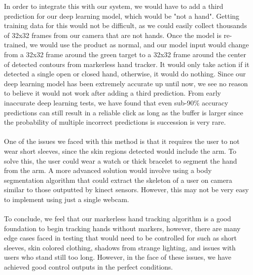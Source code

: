 \documentclass[twoside,twocolumn]{article}
\begin{document}
In order to integrate this with our system, we would have to add a third prediction for our deep learning model, which would be "not a hand". Getting training data for this would not be difficult, as we could easily collect thousands of 32x32 frames from our camera that are not hands. Once the model is re-trained, we would use the product as normal, and our model input would change from a 32x32 frame around the green target to a 32x32 frame around the center of detected contours from markerless hand tracker. It would only take action if it detected a single open or closed hand, otherwise, it would do nothing. Since our deep learning model has been extremely accurate up until now, we see no reason to believe it would not work after adding a third prediction. From early inaccurate deep learning tests, we have found that even sub-90\% accuracy predictions can still result in a reliable click as long as the buffer is larger since the probability of multiple incorrect predictions is succession is very rare.\\ \\
One of the issues we faced with this method is that it requires the user to not wear short sleeves, since the skin regions detected would include the arm. To solve this, the user could wear a watch or thick bracelet to segment the hand from the arm. A more advanced solution would involve using a body segmentation algorithm that could extract the skeleton of a user on camera similar to those outputted by kinect sensors. However, this may not be very easy to implement using just a single webcam. \\ \\
To conclude, we feel that our markerless hand tracking algorithm is a good foundation to begin tracking hands without markers, however, there are many edge cases faced in testing that would need to be controlled for such as short sleeves, skin colored clothing, shadows from strange lighting, and issues with users who stand still too long. However, in the face of these issues, we have achieved good control outputs in the perfect conditions.
\end{document}
